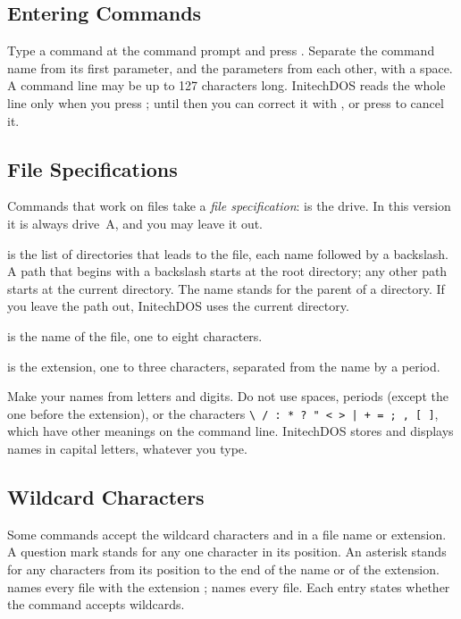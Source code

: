 \subsection{Entering Commands}
Type a command at the command prompt and press .  Separate the
command name from its first parameter, and the parameters from each other,
with a space.  A command line may be up to 127 characters long.  InitechDOS
reads the whole line only when you press ; until then you can
correct it with , or press  to cancel it.

\subsection{File Specifications}
Commands that work on files take a \emph{file specification}:
 is the drive.  In this version it is always drive~A, and you may
leave it out.

 is the list of directories that leads to the file, each name
followed by a backslash.  A path that begins with a backslash starts at the
root directory; any other path starts at the current directory.  The name
 stands for the parent of a directory.  If you leave the path out,
InitechDOS uses the current directory.

 is the name of the file, one to eight characters.

 is the extension, one to three characters, separated from the
name by a period.

Make your names from letters and digits.  Do not use spaces, periods
(except the one before the extension), or the characters
\texttt{\textbackslash{} / : * ? " < > | + = ; , [ ]}, which have other
meanings on the command line.  InitechDOS stores and displays names in
capital letters, whatever you type.

\subsection{Wildcard Characters}
Some commands accept the wildcard characters  and \type{*} in a
file name or extension.  A question mark stands for any one character in
its position.  An asterisk stands for any characters from its position to
the end of the name or of the extension.   names every file
with the extension ;  names every file.  Each entry
states whether the command accepts wildcards.

